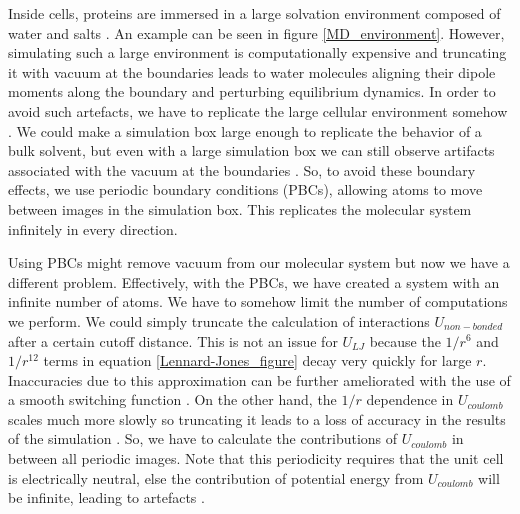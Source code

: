 Inside cells, proteins are immersed in a large solvation environment composed of water and salts \cite{phillips2012}. An example can be seen in figure \ref{MD_environment}. However, simulating such a large environment is computationally expensive and truncating it with vacuum at the boundaries leads to water molecules aligning their dipole moments along the boundary and perturbing equilibrium dynamics. In order to avoid such artefacts, we have to replicate the large cellular environment somehow \cite{ross2018}. We could make a simulation box large enough to replicate the behavior of a bulk solvent, but even with a large simulation box we can still observe artifacts associated with the vacuum at the boundaries \cite{gapsys2020}. So, to avoid these boundary effects, we use periodic boundary conditions (PBCs), allowing atoms to move between images in the simulation box. This replicates the molecular system infinitely in every direction. 

Using PBCs might remove vacuum from our molecular system but now we have a different problem. Effectively, with the PBCs, we have created a system with an infinite number of atoms. We have to somehow limit the number of computations we perform. We could simply truncate the calculation of interactions $U_{non-bonded}$ after a certain cutoff distance. This is not an issue for $U_{LJ}$ because the $1/r^6$ and $1/r^{12}$ terms in equation \ref{Lennard-Jones_figure} decay very quickly for large $r$. Inaccuracies due to this approximation can be further ameliorated with the use of a smooth switching function \cite{klauda2007}\cite{venable2009}. On the other hand, the $1/r$ dependence in $U_{coulomb}$ scales much more slowly so truncating it leads to a loss of accuracy in the results of the simulation \cite{auffinger1995}\cite{perera1995}\cite{roberts1994}\cite{delbuono1996}\cite{essmann1995}. So, we have to calculate the contributions of $U_{coulomb}$ in between all periodic images. Note that this periodicity requires that the unit cell is electrically neutral, else the contribution of potential energy from $U_{coulomb}$ will be infinite, leading to artefacts \cite{hub2014}.


